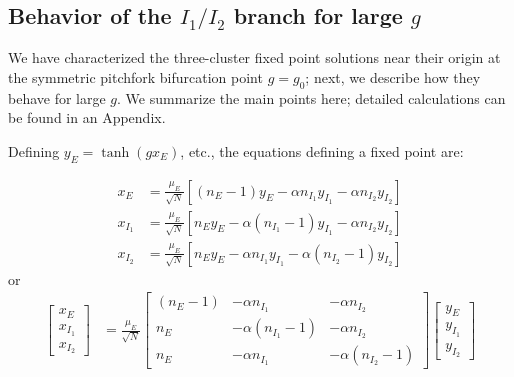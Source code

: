 \documentclass[11pt,reqno]{amsart}
\begin{document}
\subsection{Behavior of the $I_1/I_2$ branch for large $g$} \label{sec:stab_largeg}
We have characterized the three-cluster fixed point solutions near their origin at the symmetric pitchfork bifurcation point $g=g_0$; next, we describe how they behave for large $g$. We summarize the main points here; detailed calculations can be found in an Appendix.

Defining $y_E = \tanh(gx_E)$, etc., the equations defining a fixed point are:

 \begin{align*}
        x_E &= \frac{\mu_E}{\sqrt{N}} \left[ (n_E - 1)y_E - \alpha n_{I_1} y_{I_1} - \alpha n_{I_2} y_{I_2} \right] \\
        x_{I_1} &= \frac{\mu_E}{\sqrt{N}} \left[ n_E y_E - \alpha (n_{I_1}-1) y_{I_1} - \alpha n_{I_2} y_{I_2} \right] \\
        x_{I_2} &= \frac{\mu_E}{\sqrt{N}} \left[ n_E y_E - \alpha n_{I_1} y_{I_1} - \alpha (n_{I_2}-1) y_{I_2} \right] 
    \end{align*}
or
\begin{align}
 \begin{bmatrix} x_E\\x_{I_1}\\x_{I_2}\end{bmatrix} 
 &= \frac{\mu_E}{\sqrt{N}} 
 \begin{bmatrix} (n_E - 1) & -\alpha n_{I_1} & - \alpha n_{I_2}  \\
 n_E  & -\alpha (n_{I_1}-1) & - \alpha n_{I_2}  \\
 n_E  & -\alpha n_{I_1} & - \alpha (n_{I_2}-1)  
 \end{bmatrix}
 \begin{bmatrix} y_E\\y_{I_1}\\y_{I_2}\end{bmatrix} 
 \label{eq:3cluster_solution}
 \end{align}
\end{document}
